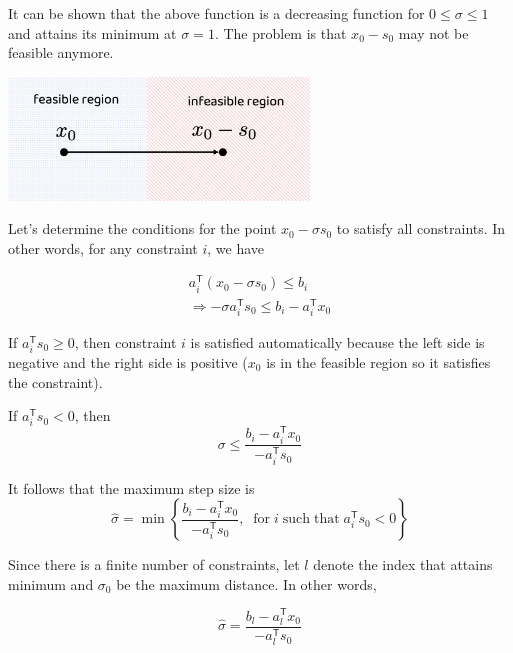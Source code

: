\documentclass[letterpaper, oneside]{book}
\theoremstyle{definition}
\theoremstyle{remark}
\begin{document}
It can be shown that the above function is a decreasing function for $0 \leqslant \sigma \leqslant 1$ and attains its minimum at $\sigma = 1$. The problem is that $x_0 - s_0$ may not be feasible anymore.


\begin{center}
	\includegraphics[width=0.6\textwidth]{search_direction.png}
\end{center}

Let's determine the conditions for the point $x_0 - \sigma s_0$ to satisfy all constraints. In other words, for any constraint $i$, we have

\begin{align*}
	a_i^{\mathsf{T}}(x_0 - \sigma s_0) \leqslant b_i \\
	\Rightarrow -\sigma a_i^{\mathsf{T}} s_0 \leqslant b_i - a_i^{\mathsf{T}}x_0
\end{align*}

If $a_i^{\mathsf{T}}s_0 \ge 0$, then constraint $i$ is satisfied automatically because the left side is negative and the right side is positive ($x_0$ is in the feasible region so it satisfies the constraint). 

If $a_i^{\mathsf{T}}s_0 < 0$, then 
\begin{displaymath}
	\sigma \leqslant \frac{b_i - a_i^{\mathsf{T}}x_0}{-a_i^{\mathsf{T}}s_0}
\end{displaymath}

It follows that the maximum step size is
\begin{displaymath}
	\hat{\sigma} = \min \left\{ 
	\frac{b_i - a_i^{\mathsf{T}}x_0}{-a_i^{\mathsf{T}}s_0}, \;\; \mathrm{for}\; i \; \mathrm{such}\;\mathrm{that}\; a_i^{\mathsf{T}}s_0 < 0
	\right\} 
\end{displaymath}

Since there is a finite number of constraints, let $l$ denote the index that attains minimum and $\sigma_0$ be the maximum distance. In other words,

\begin{displaymath}
	\hat{\sigma} = \frac{b_l - a_l^{\mathsf{T}}x_0}{-a_l^{\mathsf{T}}s_0}
\end{displaymath}
\end{document}
